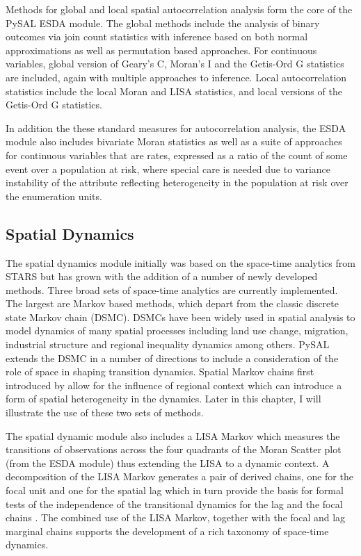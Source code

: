 \documentclass[11pt, titlepage]{article}
\begin{document}
Methods for global and local spatial autocorrelation analysis form the
core of the PySAL ESDA module. The global methods include the analysis
of binary outcomes via join count statistics with inference based on
both normal approximations as well as permutation based approaches. For
continuous variables, global version of Geary's C, Moran's I and the
Getis-Ord G statistics are included, again with multiple approaches to
inference. Local autocorrelation statistics include the local Moran and
LISA statistics, and local versions of the Getis-Ord G statistics.

In addition the these standard measures for autocorrelation analysis,
the ESDA module also includes bivariate Moran statistics as well as a
suite of approaches for continuous variables that are rates, expressed
as a ratio of the count of some event over a population at risk, where
special care is needed due to variance instability of the attribute
reflecting heterogeneity in the population at risk over the enumeration
units.

\subsection{Spatial Dynamics}

The spatial dynamics module initially was based on the space-time
analytics from STARS \citep{Rey:2006uh} but has grown with the addition of a number of
newly developed methods. Three broad sets of space-time analytics are
currently implemented. The largest are Markov based methods, which
depart from the classic discrete state Markov chain (DSMC). DSMCs have
been widely used in spatial analysis to model dynamics of many spatial
processes including land use change, migration, industrial structure and
regional inequality dynamics among others. PySAL extends the DSMC in a
number of directions to include a consideration of the role of space in
shaping transition dynamics. Spatial Markov chains first introduced by
\cite{Rey:2001of} allow for the influence of regional context which can
introduce a form of spatial heterogeneity in the dynamics. Later in this
chapter, I will illustrate the use of these two sets of methods.

The spatial dynamic module also includes a LISA Markov
\citep{Rey:2006uh}  which measures the transitions of observations
across the four quadrants of the Moran Scatter plot (from the ESDA
module) thus extending the LISA to a dynamic context. A decomposition of
the LISA Markov generates a pair of derived chains, one for the focal
unit and one for the spatial lag which in turn provide the basis for
formal tests of the independence of the transitional dynamics for the
lag and the focal chains \citep{Rey:2011gc}. The combined use of the LISA
Markov, together with the focal and lag marginal chains supports the
development of a rich taxonomy of space-time dynamics.
\end{document}
